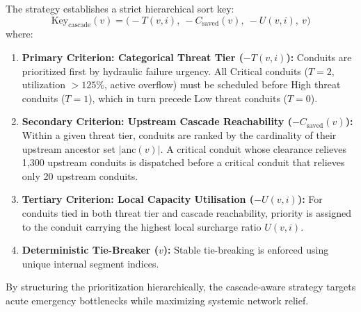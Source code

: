 The strategy establishes a strict hierarchical sort key:
\begin{equation}
\text{Key}_{\text{cascade}}(v) = \Big(-T(v, i),~ -C_{\text{saved}}(v),~ -U(v, i),~ v\Big)
\label{eqn:cascade_sort_key}
\end{equation}
where:
\begin{enumerate}
    \item \textbf{Primary Criterion: Categorical Threat Tier ($-T(v, i)$):} Conduits are prioritized first by hydraulic failure urgency. All Critical conduits ($T = 2$, utilization $> 125\%$, active overflow) must be scheduled before High threat conduits ($T = 1$), which in turn precede Low threat conduits ($T = 0$).
    \item \textbf{Secondary Criterion: Upstream Cascade Reachability ($-C_{\text{saved}}(v)$):} Within a given threat tier, conduits are ranked by the cardinality of their upstream ancestor set $|\text{anc}(v)|$. A critical conduit whose clearance relieves 1,300 upstream conduits is dispatched before a critical conduit that relieves only 20 upstream conduits.
    \item \textbf{Tertiary Criterion: Local Capacity Utilisation ($-U(v, i)$):} For conduits tied in both threat tier and cascade reachability, priority is assigned to the conduit carrying the highest local surcharge ratio $U(v, i)$.
    \item \textbf{Deterministic Tie-Breaker ($v$):} Stable tie-breaking is enforced using unique internal segment indices.
\end{enumerate}

By structuring the prioritization hierarchically, the cascade-aware strategy targets acute emergency bottlenecks while maximizing systemic network relief.

